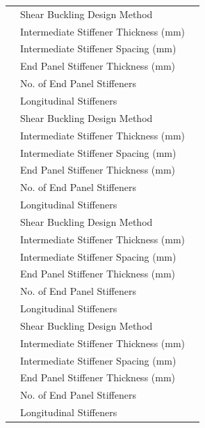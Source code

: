 \documentclass[12pt,a4paper]{report}
\numberwithin{table}{chapter}
\numberwithin{figure}{chapter}
\begin{document}
\begin{longtable}{|C{2.5cm}|L{6.5cm}|>{\arraybackslash}p{6.5cm}|}
\hline
\endlastfoot
{} & \textnormal{Shear Buckling Design Method} &  \\[6pt]
 & \textnormal{Intermediate Stiffener Thickness (mm)} &  \\[6pt]
 & \textnormal{Intermediate Stiffener Spacing (mm)} &  \\[6pt]
 & \textnormal{End Panel Stiffener Thickness (mm)} &  \\[6pt]
 & \textnormal{No. of End Panel Stiffeners} &  \\[6pt]
 & \textnormal{Longitudinal Stiffeners} &  \\[6pt]
\hline
{} & \textnormal{Shear Buckling Design Method} &  \\[6pt]
 & \textnormal{Intermediate Stiffener Thickness (mm)} &  \\[6pt]
 & \textnormal{Intermediate Stiffener Spacing (mm)} &  \\[6pt]
 & \textnormal{End Panel Stiffener Thickness (mm)} &  \\[6pt]
 & \textnormal{No. of End Panel Stiffeners} &  \\[6pt]
 & \textnormal{Longitudinal Stiffeners} &  \\[6pt]
\hline
{} & \textnormal{Shear Buckling Design Method} &  \\[6pt]
 & \textnormal{Intermediate Stiffener Thickness (mm)} &  \\[6pt]
 & \textnormal{Intermediate Stiffener Spacing (mm)} &  \\[6pt]
 & \textnormal{End Panel Stiffener Thickness (mm)} &  \\[6pt]
 & \textnormal{No. of End Panel Stiffeners} &  \\[6pt]
 & \textnormal{Longitudinal Stiffeners} &  \\[6pt]
\hline
{} & \textnormal{Shear Buckling Design Method} &  \\[6pt]
 & \textnormal{Intermediate Stiffener Thickness (mm)} &  \\[6pt]
 & \textnormal{Intermediate Stiffener Spacing (mm)} &  \\[6pt]
 & \textnormal{End Panel Stiffener Thickness (mm)} &  \\[6pt]
 & \textnormal{No. of End Panel Stiffeners} &  \\[6pt]
 & \textnormal{Longitudinal Stiffeners} &  \\[6pt]
\hline
\end{longtable}
\end{document}
